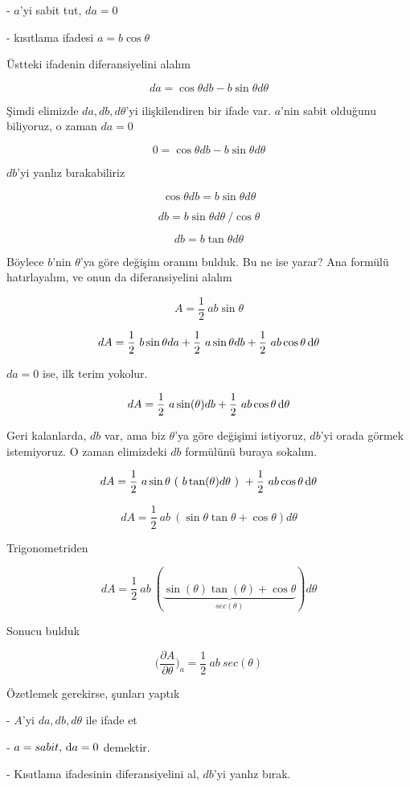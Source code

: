 \documentclass[12pt,fleqn]{article}\usepackage{../../common}
\begin{document}
- $a$'yi sabit tut, $da = 0$

- kısıtlama ifadesi $a = b \cos\theta$

Üstteki ifadenin diferansiyelini alalım

$$ da = \cos \theta db - b \sin\theta d\theta $$

Şimdi elimizde $da,db,d\theta$'yi ilişkilendiren bir ifade var. $a$'nin
sabit olduğunu biliyoruz, o zaman $da=0$

$$ 0 = \cos \theta db - b \sin \theta d\theta $$

$db$'yi yanlız bırakabiliriz

$$ \cos\theta db = b \sin\theta d\theta $$

$$ db = b \sin\theta d\theta \ / \cos\theta $$

$$ db = b \tan\theta d\theta  $$

Böylece $b$'nin $\theta$'ya göre değişim oranını bulduk. Bu ne ise yarar?
Ana formülü hatırlayalım, ve onun da diferansiyelini alalım

$$ A = \frac{1}{2} \ ab \sin\theta $$

$$ dA = \frac{1}{2} \ b \sin\theta da + 
\frac{1}{2} \ a \sin\theta db + 
\frac{1}{2} \ ab \cos\theta \,\mathrm{d} \theta
 $$

$da = 0$ ise, ilk terim yokolur. 

$$ dA = 
\frac{1}{2} \ a \sin(\theta) db + 
\frac{1}{2} \ ab \cos \theta \,\mathrm{d} \theta
$$

Geri kalanlarda, $db$ var, ama biz $\theta$'ya göre değişimi istiyoruz,
$db$'yi orada görmek istemiyoruz. O zaman elimizdeki $db$ formülünü buraya
sokalım. 

$$ dA =  
\frac{1}{2} \ a \sin\theta \ ( \ b \tan(\theta) d\theta \ ) \ + 
\frac{1}{2} \ ab \cos\theta \,\mathrm{d} \theta
$$

$$ dA =  
\frac{1}{2} \ ab \ (\sin\theta \tan\theta +  \cos\theta )d\theta
$$

Trigonometriden 

$$ dA =  
\frac{1}{2} \ ab \ (
\underbrace{\sin(\theta) \tan(\theta) +  \cos \theta}_{sec(\theta)}
)d\theta
$$

Sonucu bulduk 

$$ \bigg( \frac{\partial A}{\partial \theta} \bigg)_{a} = 
\frac{1}{2} \ ab \ sec(\theta)
$$

Özetlemek gerekirse, şunları yaptık

- $A$'yi $da,db,d\theta$ ile ifade et

- $a=sabit, \,\mathrm{d} a=0$ demektir.

- Kısıtlama ifadesinin diferansiyelini al, $db$'yi yanlız bırak. 
\end{document}
